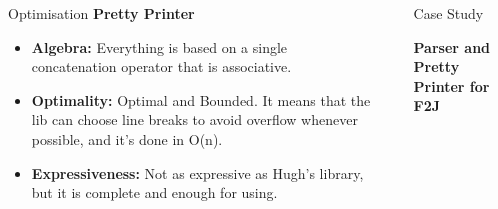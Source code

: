 \documentclass[final]{beamer}
\newlength{\sepwid}
\newlength{\onecolwid}
\newlength{\twocolwid}
\begin{document}
\begin{frame}[t]
\begin{columns}[t]
\begin{column}{\twocolwid}
\begin{columns}[t,totalwidth=\twocolwid]
\begin{column}{\onecolwid}
\begin{block}{Optimisation}
\textbf{Pretty Printer}
\begin{itemize}
\item \textbf{Algebra:} Everything is based on a single concatenation operator that is associative.
\item \textbf{Optimality:} Optimal and Bounded. It means that the lib can choose line breaks to avoid overflow whenever possible, and it's done in O(n).
\item \textbf{Expressiveness:} Not as expressive as Hugh's library, but it is complete and enough for using.

\end{itemize}





\end{block}


\end{column} %

\end{columns} %

\end{column} %

\begin{column}{\sepwid}\end{column} %

\begin{column}{\onecolwid} %


\begin{block}{Case Study}

\textbf{Parser and Pretty Printer for F2J}


\end{block}
\end{column}
\end{columns}
\end{frame}
\end{document}
